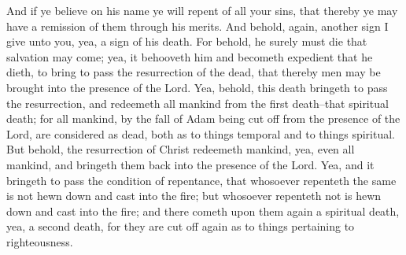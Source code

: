 \bverse \iffalse And if ye believe on his name ye will repent of all your sins, that thereby ye may have a remission of them through his merits. \fi
And if ye believe on his name ye will repent of all your sins, that thereby ye may have a remission of them through his merits.
\bverse \iffalse And behold, again, another sign I give unto you, yea, a sign of his death. \fi
And behold, again, another sign I give unto you, yea, a sign of his death.
\bverse \iffalse For behold, he surely must die that salvation may come; yea, it behooveth him and becometh expedient that he dieth, to bring to pass the resurrection of the dead, that thereby men may be brought into the presence of the Lord. \fi
For behold, he surely must die that salvation may come; yea, it behooveth him and becometh expedient that he dieth, to bring to pass the resurrection of the dead, that thereby men may be brought into the presence of the Lord.
\bverse \iffalse Yea, behold, this death bringeth to pass the resurrection, and redeemeth all mankind from the first death--that spiritual death; for all mankind, by the fall of Adam being cut off from the presence of the Lord, are considered as dead, both as to things temporal and to things spiritual. \fi
Yea, behold, this death bringeth to pass the resurrection, and redeemeth all mankind from the first death--that spiritual death; for all mankind, by the fall of Adam being cut off from the presence of the Lord, are considered as dead, both as to things temporal and to things spiritual.
\bverse \iffalse But behold, the resurrection of Christ redeemeth mankind, yea, even all mankind, and bringeth them back into the presence of the Lord. \fi
But behold, the resurrection of Christ redeemeth mankind, yea, even all mankind, and bringeth them back into the presence of the Lord.
\bverse \iffalse Yea, and it bringeth to pass the condition of repentance, that whosoever repenteth the same is not hewn down and cast into the fire; but whosoever repenteth not is hewn down and cast into the fire; and there cometh upon them again a spiritual death, yea, a second death, for they are cut off again as to things pertaining to righteousness. \fi
Yea, and it bringeth to pass the condition of repentance, that whosoever repenteth the same is not hewn down and cast into the fire; but whosoever repenteth not is hewn down and cast into the fire; and there cometh upon them again a spiritual death, yea, a second death, for they are cut off again as to things pertaining to righteousness.
